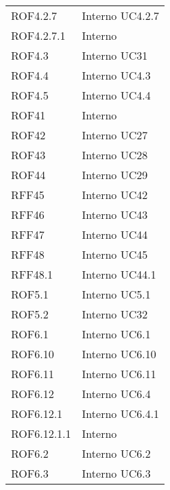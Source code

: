 \begin{longtable}{p{2.5cm}!{\VRule[1pt]}p{2.5cm}}
	ROF4.2.7 & Interno \newline UC4.2.7
	\\
	ROF4.2.7.1 & Interno \\
	ROF4.3 & Interno \newline UC31
	\\
	ROF4.4 & Interno \newline UC4.3
	\\
	ROF4.5 & Interno \newline UC4.4
	\\
	ROF41 & Interno \\
	ROF42 & Interno \newline UC27
	\\
	ROF43 & Interno \newline UC28
	\\
	ROF44 & Interno \newline UC29
	\\
	RFF45 & Interno \newline UC42
	\\
	RFF46 & Interno \newline UC43
	\\
	RFF47 & Interno \newline UC44
	\\
	RFF48 & Interno \newline UC45
	\\
	RFF48.1 & Interno \newline UC44.1
	\\
	ROF5.1 & Interno \newline UC5.1
	\\
	ROF5.2 & Interno \newline UC32
	\\
	ROF6.1 & Interno \newline UC6.1
	\\
	ROF6.10 & Interno \newline UC6.10
	\\
	ROF6.11 & Interno \newline UC6.11
	\\
	ROF6.12 & Interno \newline UC6.4
	\\
	ROF6.12.1 & Interno \newline UC6.4.1
	\\
	ROF6.12.1.1 & Interno \\
	ROF6.2 & Interno \newline UC6.2
	\\
	ROF6.3 & Interno \newline UC6.3

\end{longtable}
